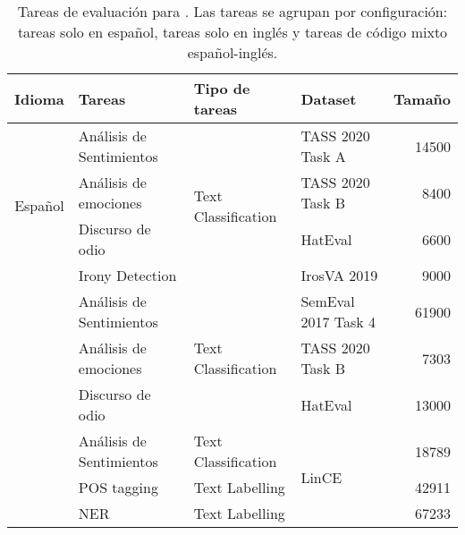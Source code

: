 \begin{table*}[ht!]
    \centering
    \footnotesize
    \begin{tabular}{c lll r}
        Idioma                          & Tareas               & Tipo de tareas                          & Dataset               & Tamaño  \\
        \hline
        \multirow{4}{*}{Español}          & Análisis de Sentimientos  & \multirow{4}{*}{Text Classification}  & TASS 2020 Task A      & \num{14500}      \\
                                          & Análisis de emociones    &                                       & TASS 2020 Task B      & \num{8400}       \\
                                          & Discurso de odio         &                                       & HatEval               & \num{6600}       \\
                                          & Irony Detection     &                                       & IrosVA 2019           & \num{9000}       \\
        \hline \rule{0pt}{1.2em}
        \multirow{3}{*}{Inglés}          & Análisis de Sentimientos  & \multirow{3}{*}{Text Classification}  & SemEval 2017 Task 4   & \num{61900}       \\
                                          & Análisis de emociones    &                                       & TASS 2020 Task B      & \num{7303}        \\
                                          & Discurso de odio         &                                       & HatEval               & \num{13000}       \\
        \hline \rule{0pt}{1.2em}
        \multirow{3}{*}{Español-Inglés}  & Análisis de Sentimientos  & Text Classification                   & \multirow{3}{*}{LinCE}& \num{18789}      \\
                                          & POS tagging         & Text Labelling                        &                       & \num{42911}       \\
                                          & NER                 & Text Labelling                        &                       & \num{67233}       \\
        \hline

    \end{tabular}
    \caption{Tareas de evaluación para \robertuito{}. Las tareas se agrupan por configuración: tareas solo en español, tareas solo en inglés y tareas de código mixto español-inglés. }
    \label{tab:evaluation_settings}
\end{table*}


